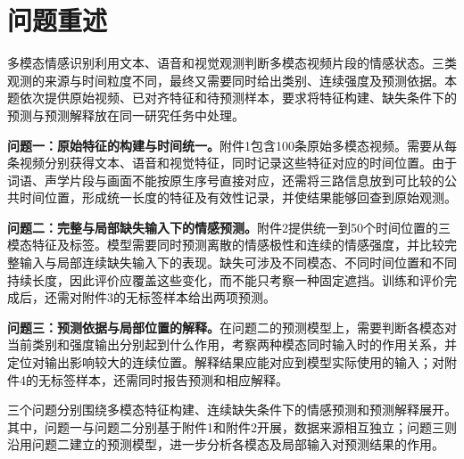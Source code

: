 \section{问题重述}\label{sec:problem_restatement}

多模态情感识别利用文本、语音和视觉观测判断多模态视频片段的情感状态\cite{baltrusaitis2019multimodal,poria2017affective}。三类观测的来源与时间粒度不同，最终又需要同时给出类别、连续强度及预测依据。本题依次提供原始视频、已对齐特征和待预测样本，要求将特征构建、缺失条件下的预测与预测解释放在同一研究任务中处理。

\textbf{问题一：原始特征的构建与时间统一。}附件1包含100条原始多模态视频。需要从每条视频分别获得文本、语音和视觉特征，同时记录这些特征对应的时间位置。由于词语、声学片段与画面不能按原生序号直接对应，还需将三路信息放到可比较的公共时间位置，形成统一长度的特征及有效性记录，并使结果能够回查到原始观测。

\textbf{问题二：完整与局部缺失输入下的情感预测。}附件2提供统一到50个时间位置的三模态特征及标签。模型需要同时预测离散的情感极性和连续的情感强度，并比较完整输入与局部连续缺失输入下的表现。缺失可涉及不同模态、不同时间位置和不同持续长度，因此评价应覆盖这些变化，而不能只考察一种固定遮挡。训练和评价完成后，还需对附件3的无标签样本给出两项预测。

\textbf{问题三：预测依据与局部位置的解释。}在问题二的预测模型上，需要判断各模态对当前类别和强度输出分别起到什么作用，考察两种模态同时输入时的作用关系，并定位对输出影响较大的连续位置。解释结果应能对应到模型实际使用的输入；对附件4的无标签样本，还需同时报告预测和相应解释。

三个问题分别围绕多模态特征构建、连续缺失条件下的情感预测和预测解释展开。其中，问题一与问题二分别基于附件1和附件2开展，数据来源相互独立；问题三则沿用问题二建立的预测模型，进一步分析各模态及局部输入对预测结果的作用。
